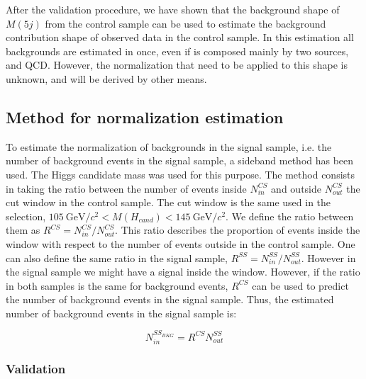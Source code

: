 After the validation procedure, we have shown that the background shape of $M(5j)$ from the control sample can be used to estimate the background contribution shape of observed data in the control sample. In this estimation all backgrounds are estimated in once, even if is composed mainly by two sources, \ttbar and QCD. However, the normalization that need to be applied to this shape is unknown, and will be derived by other means. 

\subsection{Method for normalization estimation}
\label{sec:bkgnormmet}

To estimate the normalization of backgrounds in the signal sample, i.e. the number of background events in the signal sample, a sideband method has been used. The Higgs candidate mass was used for this purpose. The method consists in taking the ratio between the number of events inside $N^{CS}_{in}$ and outside $N^{CS}_{out}$ the cut window in the control sample. The cut window is the same used in the selection, $105~\text{GeV}/c^{2} <M(H_{cand})<145~\text{GeV}/c^{2}$. We define the ratio between them as $R^{CS}=N^{CS}_{in}/N^{CS}_{out}$. This ratio describes the proportion of events inside the window with respect to the number of events outside in the control sample. One can also define the same ratio in the signal sample, $R^{SS}=N^{SS}_{in}/N^{SS}_{out}$. However in the signal sample we might have a signal inside the window. However, if the ratio in both samples is the same for background events, $R^{CS}$ can be used to predict the number of background events in the signal sample. Thus, the estimated number of background events in the signal sample is:

\begin{equation}
  \label{eq:NormMethod}
  N^{SS_{BKG}}_{in}=R^{CS}N^{SS}_{out}
\end{equation}

\subsubsection{Validation}
\label{sec:normval}

